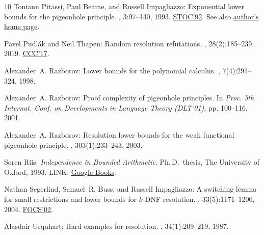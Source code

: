 \begin{thebibliography}{10}
{\sc Toniann Pitassi, Paul Beame, and Russell Impagliazzo}: Exponential lower
  bounds for the pigeonhole principle.
, 3:97--140, 1993.
\newblock \prelim \href{https://doi.org/10.1145/129712.129733}{STOC'92}. See
  also \href{https://homes.cs.washington.edu/~beame/papers/php.pdf}{author's
  home page}.
\newblock [\epfmtdoi{10.1007/BF01200117}]

{\sc Pavel Pudl{\'a}k and Neil Thapen}: Random resolution refutations.
, 28(2):185--239, 2019.
\newblock \prelim \href{https://doi.org/10.4230/LIPIcs.CCC.2017.1}{CCC'17}.
\newblock [\epfmtdoi{10.1007/s00037-019-00182-7}]

{\sc Alexander~A. Razborov}: Lower bounds for the polynomial calculus.
, 7(4):291--324, 1998.
\newblock [\epfmtdoi{10.1007/s000370050013}]

{\sc Alexander~A. Razborov}: Proof complexity of pigeonhole principles.
\newblock In {\em Proc. 5th Internat. Conf. on Developments in Language Theory
  (DLT'01)}, pp. 100--116, 2001.
\newblock [\epfmtdoi{10.1007/3-540-46011-X\_8}]

{\sc Alexander~A. Razborov}: Resolution lower bounds for the weak functional
  pigeonhole principle.
, 303(1):233--243, 2003.
\newblock [\epfmtdoi{10.1016/S0304-3975(02)00453-X}]

{\sc S{\o}ren Riis}: {\em Independence in Bounded Arithmetic}.
\newblock Ph.\,D.\ thesis, The University of Oxford, 1993.
\newblock LINK: \href{https://books.google.com/books?id=aLy1PAAACAAJ}{Google
  Books}.

{\sc Nathan Segerlind, Samuel~R. Buss, and Russell Impagliazzo}: A switching
  lemma for small restrictions and lower bounds for $k$-{DNF} resolution.
, 33(5):1171--1200, 2004.
\newblock \prelim \href{doi:10.1109/SFCS.2002.1181984}{FOCS'02}.
\newblock [\epfmtdoi{10.1137/S0097539703428555}]

{\sc Alasdair Urquhart}: Hard examples for resolution.
, 34(1):209--219, 1987.
\newblock [\epfmtdoi{10.1145/7531.8928}]

\end{thebibliography}